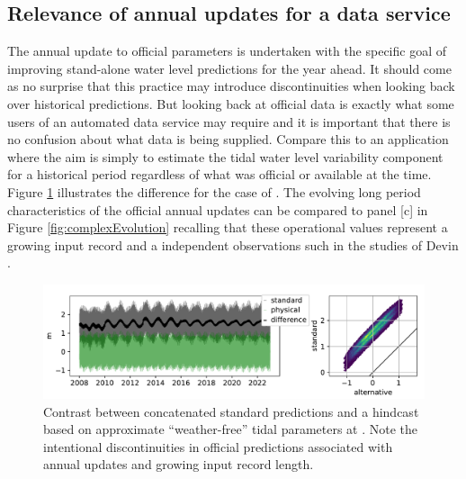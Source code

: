 \subsection{Relevance of annual updates for a data service}
The annual update to official parameters is undertaken with the specific goal of improving stand-alone water level predictions for the year ahead.  It should come as no surprise that this practice may introduce discontinuities when looking back over historical predictions.
But looking back at official data is exactly what some users of an automated data service may require and it is important that there is no confusion about what data is being supplied.
Compare this to an application where the aim is simply to estimate the tidal water level variability component  for a historical period regardless of what was official or available at the time.
Figure \ref{fig:tideHistoryTs} illustrates the difference for the case of  \Dname{}.  The evolving long period characteristics of the official annual updates can be compared to panel [c] in Figure \ref{fig:complexEvolution} recalling that these operational values represent a growing input record and a independent observations such in the studies of Devin \citep{10.1002/2017jc013165}. 

\begin{figure}[H]\centering
    \includegraphics[width=\figwidthFull]{figures/plots/piecewiseTide_62430.pdf}
        \caption{Contrast between concatenated standard predictions and a hindcast based on approximate ``weather-free'' tidal parameters at \Dname{}.  Note the intentional discontinuities in official predictions associated with annual updates and growing input record length.}
    \label{fig:tideHistoryTs}
\end{figure}   

